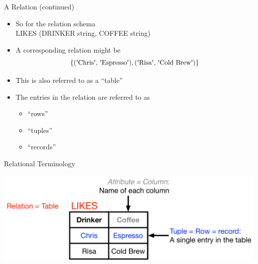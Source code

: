 \documentclass[aspectratio=169]{beamer}
\begin{document}
\begin{frame}{A Relation (continued)}

\begin{itemize}
\item So for the relation schema\\ LIKES (DRINKER string, COFFEE string)
\item A corresponding relation might be
	$$\{(\textrm{\textquotesingle{Chris}\textquotesingle, \textquotesingle{Espresso\textquotesingle}}), \textrm{(\textquotesingle{Risa}\textquotesingle, \textquotesingle{Cold Brew}\textquotesingle)}\}$$
\item This is also referred to as a ``table''
\item The entries in the relation are referred to as
	\begin{itemize}
	\item ``rows''
	\item ``tuples'' %
	\item ``records'' %
	\end{itemize}
\end{itemize}
\end{frame}
\begin{frame}{Relational Terminology}

{\centering\includegraphics[width=1\textwidth]{./lectRDBMS/terminology.pdf}\par}
\end{frame}
\end{document}
